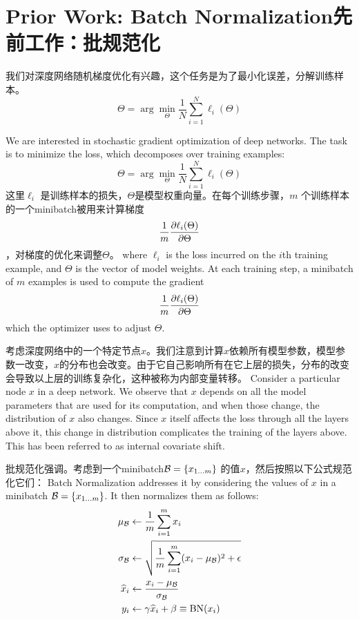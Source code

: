 \section{Prior Work: Batch Normalization先前工作：批规范化}
我们对深度网络随机梯度优化有兴趣，这个任务是为了最小化误差，分解训练样本。
$$\Theta = \arg \min_\Theta
\frac{1}{N}\sum_{i=1}^N \ell_i(\Theta)$$

We are interested in stochastic gradient optimization of deep networks. The task is to minimize the loss, which decomposes over training examples:
$$\Theta = \arg \min_\Theta
\frac{1}{N}\sum_{i=1}^N \ell_i(\Theta)$$
这里$\ell_i$ 是训练样本的损失，$\Theta$是模型权重向量。在每个训练步骤，$m$ 个训练样本的一个minibatch被用来计算梯度$$\frac{1}{m} \frac{\partial  \ell_i(\Theta)}{\partial  \Theta}$$，对梯度的优化来调整$\Theta$。
where $\ell_i$ is the loss incurred on the $i$th training example, and $\Theta$ is the vector of model weights. At each training step, a minibatch of $m$ examples is used to compute the  gradient
$$\frac{1}{m} \frac{\partial  \ell_i(\Theta)}{\partial  \Theta}$$
which the optimizer uses to adjust $\Theta$.

考虑深度网络中的一个特定节点$x$。我们注意到计算$x$依赖所有模型参数，模型参数一改变，$x$的分布也会改变。由于它自己影响所有在它上层的损失，分布的改变会导致以上层的训练复杂化，这种被称为内部变量转移。
Consider a particular node $x$ in a deep network. We observe that $x$ depends on all the model parameters that are used for its computation, and when those change, the distribution of $x$ also changes. Since $x$ itself affects the loss through all the layers above it, this change in distribution complicates the training of the layers above. This has been referred to as internal covariate shift.

批规范化强调。考虑到一个minibatch$\mathcal{B}=\{x_{1\ldots m}\}$ 的值$x$，然后按照以下公式规范化它们：
Batch Normalization \cite{batchnorm} addresses it by considering the values of $x$ in a minibatch $\mathcal{B}=\{x_{1\ldots m}\}$. It then normalizes them as follows:
\begin{align*}
    \mu_{\mathcal{B}} &\leftarrow \frac{1}{m}\sum_{i=1}^m x_i\\
  \sigma_{\mathcal{B}} &\leftarrow  \sqrt{\frac{1}{m}\sum_{i=1}^m (x_i-\mu_{\mathcal{B}})^2+\epsilon}\\
\widehat{x}_i &\leftarrow \frac{x_i-\mu_{\mathcal{B}}}{\sigma_{\mathcal{B}}}
\\
  y_i &\leftarrow \gamma\widehat{x}_i + \beta  \equiv \text{BN}(x_i)
\end{align*}

